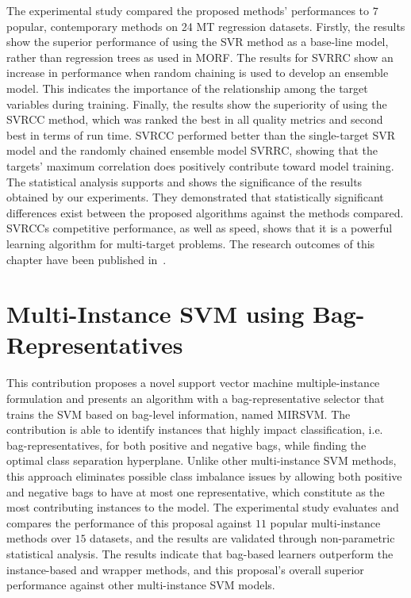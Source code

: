 \documentclass[reqno]{vcuthesis}
\numberwithin{equation}{chapter}
\begin{document}
The experimental study compared the proposed methods' performances to $7$ popular, contemporary methods on 24 MT regression datasets. Firstly, the results show the superior performance of using the SVR method as a base-line model, rather than regression trees as used in MORF. The results for SVRRC show an increase in performance when random chaining is used to develop an ensemble model. This indicates the importance of the relationship among the target variables during training. Finally, the results show the superiority of using the SVRCC method, which was ranked the best in all quality metrics and second best in terms of run time. SVRCC performed better than the single-target SVR model and the randomly chained ensemble model SVRRC, showing that the targets' maximum correlation does positively contribute toward model training. The statistical analysis supports and shows the significance of the results obtained by our experiments. They demonstrated that statistically significant differences exist between the proposed algorithms against the methods compared. SVRCCs competitive performance, as well as speed, shows that it is a powerful learning algorithm for multi-target problems. The research outcomes of this chapter have been published in~\cite{melki2017multi}.

\chapter{Multi-Instance SVM using Bag-Representatives \label{chap:mirsvm}}
This contribution proposes a novel support vector machine multiple-instance formulation and presents an algorithm with a bag-representative selector that trains the SVM based on bag-level information, named MIRSVM. The contribution is able to identify instances that highly impact classification, i.e. bag-representatives, for both positive and negative bags, while finding the optimal class separation hyperplane. Unlike other multi-instance SVM methods, this approach eliminates possible class imbalance issues by allowing both positive and negative bags to have at most one representative, which constitute as the most contributing instances to the model. The experimental study evaluates and compares the performance of this proposal against $11$ popular multi-instance methods over $15$ datasets, and the results are validated through non-parametric statistical analysis. The results indicate that bag-based learners outperform the instance-based and wrapper methods, and this proposal's overall superior performance against other multi-instance SVM models. 
\end{document}
